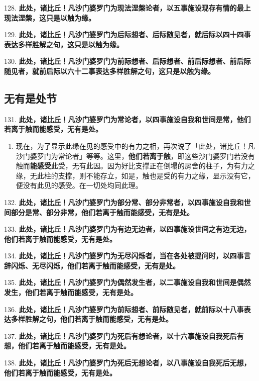 {\Large 128.} \textbf{此处，诸比丘！凡沙门婆罗门为现法涅槃论者，以五事施设现存有情的最上现法涅槃，这只是以触为缘。}

{\Large 129.} \textbf{此处，诸比丘！凡沙门婆罗门为后际想者、后际随见者，就后际以四十四事表达多样胜解之句，这只是以触为缘。}

{\Large 130.} \textbf{此处，诸比丘！凡沙门婆罗门为前际想者、后际想者、前后际想者、前后际随见者，就前后际以六十二事表达多样胜解之句，这只是以触为缘。}

\subsection{无有是处节}

{\Large 131.} \textbf{此处，诸比丘！凡沙门婆罗门为常论者，以四事施设自我和世间是常，他们若离于触而能感受，无有是处。}

\begin{enumerate}\item 现在，为了显示此缘在见的感受中的有力之相，再次说了「此处，诸比丘！凡沙门婆罗门为常论者」等等。这里，\textbf{他们若离于触}，即这些沙门婆罗门若没有触而\textbf{能感受}此受，无有此因。因为好比支撑正在倒塌的房舍的柱子，为有力之缘，无此柱的支撑，则不能存立，如是，触也是受的有力之缘，显示没有它，便没有此见的感受。在一切处均同此理。\end{enumerate}

{\Large 132.} \textbf{此处，诸比丘！凡沙门婆罗门为部分常、部分非常者，以四事施设自我和世间部分是常、部分非常，他们若离于触而能感受，无有是处。}

{\Large 133.} \textbf{此处，诸比丘！凡沙门婆罗门为有边无边者，以四事施设世间之有边无边，他们若离于触而能感受，无有是处。}

{\Large 134.} \textbf{此处，诸比丘！凡沙门婆罗门为无尽闪烁者，当在各处被提问时，以四事言辞闪烁、无尽闪烁，他们若离于触而能感受，无有是处。}

{\Large 135.} \textbf{此处，诸比丘！凡沙门婆罗门为偶然发生者，以二事施设自我和世间是偶然发生，他们若离于触而能感受，无有是处。}

{\Large 136.} \textbf{此处，诸比丘！凡沙门婆罗门为前际想者、前际随见者，就前际以十八事表达多样胜解之句，他们若离于触而能感受，无有是处。}

{\Large 137.} \textbf{此处，诸比丘！凡沙门婆罗门为死后有想论者，以十六事施设自我死后有想，他们若离于触而能感受，无有是处。}

{\Large 138.} \textbf{此处，诸比丘！凡沙门婆罗门为死后无想论者，以八事施设自我死后无想，他们若离于触而能感受，无有是处。}

